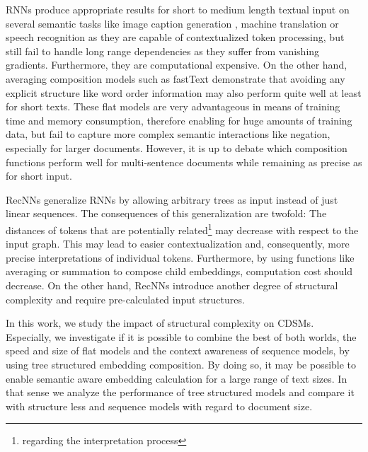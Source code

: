 \acp{RNN} produce appropriate results for short to medium length textual input on several semantic tasks like image caption generation %
\autocite{vinyals_show_2014}, machine translation \autocite{wu_googles_2016} or speech recognition \autocite{xiong_microsoft_2017} as they are capable of contextualized token processing, but still fail to handle long range dependencies as they suffer from vanishing gradients. %
Furthermore, they are computational expensive. On the other hand, averaging composition models such as fastText \autocite{joulin_bag_2017} demonstrate that avoiding any explicit structure like word order information %
may also perform quite well at least for short texts. These flat models are very advantageous in means of training time and memory consumption, therefore enabling for huge amounts of training data, but fail to capture more complex semantic interactions like negation, especially for larger documents. However, it is up to debate which composition functions perform well for multi-sentence documents while remaining as precise as for short input.%

\acp{RecNN} \autocite{goller_learning_1996,socher_parsing_2011} generalize \acp{RNN} by allowing arbitrary trees as input instead of just linear sequences. The consequences of this generalization are twofold: The distances of tokens that are potentially related\footnote{regarding the interpretation process} may decrease with respect to the input graph. This may lead to easier contextualization and, consequently, more precise interpretations of individual tokens. Furthermore, by using functions like averaging or summation to compose child embeddings, computation cost should decrease. On the other hand, \acp{RecNN} introduce another degree of structural complexity and require pre-calculated input structures.%

In this work, we study the impact of structural complexity on \acp{CDSM}. Especially, we investigate if it is possible to combine the best of both worlds, the speed and size of flat models and the context awareness of sequence models, by using tree structured embedding composition. By doing so, it may be possible to enable semantic aware embedding calculation for a large range of text sizes. In that sense we analyze the performance of tree structured models and compare it with structure less and sequence models with regard to document size.


